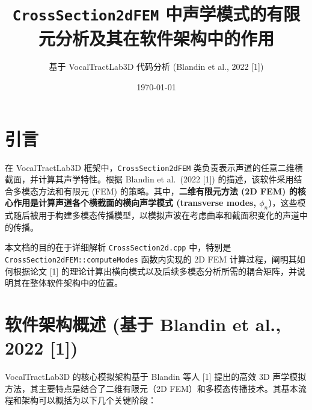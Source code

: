 \documentclass{ctexart}
\title{\texttt{CrossSection2dFEM} 中声学模式的有限元分析及其在软件架构中的作用}
\author{基于 VocalTractLab3D 代码分析 (Blandin et al., 2022 [1])}
\date{\today}
\begin{document}
\maketitle

\section{引言}
在 VocalTractLab3D 框架中，\texttt{CrossSection2dFEM} 类负责表示声道的任意二维横截面，并计算其声学特性。根据 Blandin et al.~(2022 [1]) 的描述，该软件采用结合多模态方法和有限元 (FEM) 的策略。其中，\textbf{二维有限元方法 (2D FEM) 的核心作用是计算声道各个横截面的横向声学模式 (transverse modes, $\phi_n$)}，这些模式随后被用于构建多模态传播模型，以模拟声波在考虑曲率和截面积变化的声道中的传播。

本文档的目的在于详细解析 \texttt{CrossSection2d.cpp} 中，特别是 \texttt{CrossSection2dFEM::computeModes} 函数内实现的 2D FEM 计算过程，阐明其如何根据论文 [1] 的理论计算出横向模式以及后续多模态分析所需的耦合矩阵，并说明其在整体软件架构中的位置。

\section{软件架构概述 (基于 Blandin et al., 2022 [1])}
VocalTractLab3D 的核心模拟架构基于 Blandin 等人 [1] 提出的高效 3D 声学模拟方法，其主要特点是结合了二维有限元（2D FEM）和多模态传播技术。其基本流程和架构可以概括为以下几个关键阶段：
\end{document}

